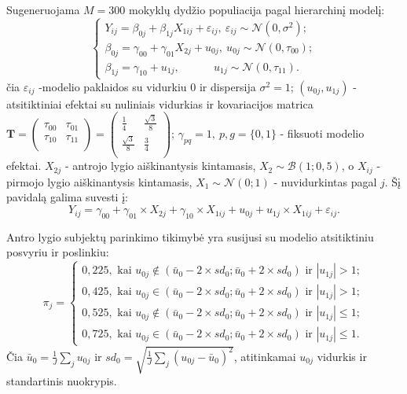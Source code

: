 \documentclass[12pt,a4paper]{article}
\begin{document}
\indent Sugeneruojama $M=300$ mokyklų dydžio populiacija pagal hierarchinį modelį:
\begin{equation}\label{eq:wsimul}
\left\{
\begin{array}{l}
Y_{ij}=\beta_{0j}+\beta_{1j}X_{1ij}+\varepsilon_{ij}, \ \varepsilon_{ij}\sim \mathcal{N}(0, \sigma^2);\\
\beta_{0j}=\gamma_{00}+\gamma_{01}X_{2j}+u_{0j}, \ u_{0j}\sim \mathcal{N}(0, \tau_{00});\\
\beta_{1j}=\gamma_{10}+u_{1j}, \ \ \ \ \ \ \ \ \ \ \  \ \  \ u_{1j}\sim \mathcal{N}(0, \tau_{11}).
\end{array} \right.
\end{equation}
čia $\varepsilon_{ij}$ -modelio paklaidos su vidurkiu $0$ ir dispersija $\sigma^2=1$; $\left(u_{0j}, u_{1j}\right)$ - atsitiktiniai efektai su nuliniais vidurkias ir kovariacijos matrica $\mathbf{T}=\begin{pmatrix}
\tau_{00} & \tau_{01} \\
\tau_{10} & \tau_{11} \\
\end{pmatrix}=\begin{pmatrix}
\frac{1}{4}& \frac{\sqrt{3}}{8} \\
 \frac{\sqrt{3}}{8} & \frac{3}{4}\\
\end{pmatrix}$; $\gamma_{pq}=1,\ p,g = \{0,1\}$ - fiksuoti modelio efektai. $X_{2j}$ - antrojo lygio aiškinantysis kintamasis, $X_2\sim \mathcal{B}(1;0,5)$, o $X_{ij}$ - pirmojo lygio aiškinantysis kintamasis, $X_1\sim \mathcal{N}(0;1)$ - nuvidurkintas pagal $j$. Šį pavidalą galima suvesti į:
\begin{equation} \label{eq:deq}
Y_{ij} = \gamma_{00} +\gamma_{01}\times X_{2j}+ \gamma_{10}\times X_{1ij}+u_{0j}+u_{1j}\times X_{1ij}+\varepsilon_{ij}.
\end{equation}

\indent Antro lygio subjektų parinkimo tikimybė yra susijusi su modelio atsitiktiniu posvyriu ir poslinkiu:
\begin{equation}
\pi_j=
\left\{
\begin{array}{l}
0,225, \text{ kai } u_{0j} \notin \left(\bar{u}_0-2\times sd_0; \bar{u}_0+2\times sd_0\right) \text{ ir } |u_{1j}| > 1;\\
0,425, \text{ kai } u_{0j} \in \left(\bar{u}_0-2\times sd_0; \bar{u}_0+2\times sd_0\right) \text{ ir } |u_{1j}| > 1;\\
0,525, \text{ kai } u_{0j} \notin \left(\bar{u}_0-2\times sd_0; \bar{u}_0+2\times sd_0\right) \text{ ir } |u_{1j}| \leq 1;\\
0,725, \text{ kai } u_{0j} \in \left(\bar{u}_0-2\times sd_0; \bar{u}_0+2\times sd_0\right) \text{ ir } |u_{1j}| \leq 1.
\end{array} \right.
\end{equation}
\noindent Čia $\bar{u}_0=\frac{1}{J}\sum_ju_{0j}$ ir $sd_0=\sqrt{\frac{1}{J}\sum_j(u_{0j}-\bar{u}_0)^2}$, atitinkamai $u_{0j}$ vidurkis ir standartinis nuokrypis. 
\end{document}
